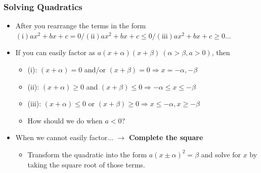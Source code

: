 \documentclass[pdflatex, 12pt]{beamer}
\begin{document}
\begin{frame}
\frametitle{Solving Quadratics}
\begin{itemize}
\item After you rearrange the terms in the form $\mathrm{(i)} ax^2 + bx + c = 0 /\mathrm{(ii)} ax^2 + bx + c \leq 0 /\mathrm{(iii)} ax^2 + bx + c \geq 0$...
\vspace{0.4cm}
\item If you can easily factor as $a(x + \alpha)(x + \beta)\ (\alpha > \beta, a > 0)$, then
 \begin{itemize}
 \item (i): $(x + \alpha) = 0$ and/or $(x + \beta) = 0 \Rightarrow x = -\alpha, -\beta$
 \item (ii): $(x + \alpha) \geq 0$ and  $(x + \beta) \leq 0 \Rightarrow -\alpha \leq x \leq -\beta$
 \item (iii): $(x + \alpha) \leq 0$ or $(x + \beta) \geq 0 \Rightarrow x \leq -\alpha, x \geq -\beta$
 \item How should we do when $a < 0$?
 \end{itemize}
\vspace{0.4cm}
\item When we cannot easily factor... $\rightarrow$ \textbf{Complete the square}
 \begin{itemize}
 \item Transform the quadratic into the form $a(x \pm \alpha)^2 = \beta$ and solve for $x$ by taking the square root of those terms.
 \end{itemize}
\end{itemize}
\end{frame}
\end{document}
